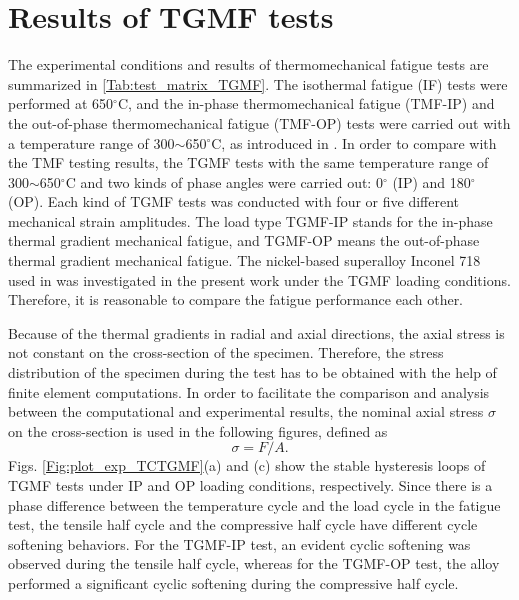\documentclass[preprint,5p,twocolumn,10pt,sort&compress]{elsarticle}
\begin{document}
\section{Results of TGMF tests}

The experimental conditions and results of thermomechanical fatigue tests are summarized in \autoref{Tab:test_matrix_TGMF}. The isothermal fatigue (IF) tests were performed at 650$^\circ$C, and the in-phase thermomechanical fatigue (TMF-IP) and the out-of-phase thermomechanical fatigue (TMF-OP) tests were carried out with a temperature range of 300$\sim$650$^\circ$C, as introduced in \cite{SUN2019228, SUN201989}. In order to compare with the TMF testing results, the TGMF tests with the same temperature range of 300$\sim$650$^\circ$C and two kinds of phase angles were carried out: 0$^\circ$ (IP) and 180$^\circ$ (OP). Each kind of TGMF tests was conducted with four or five different mechanical strain amplitudes. The load type TGMF-IP stands for the in-phase thermal gradient mechanical fatigue, and TGMF-OP means the out-of-phase thermal gradient mechanical fatigue. The nickel-based superalloy Inconel 718 used in \cite{SUN2019228, SUN201989} was investigated in the present work under the TGMF loading conditions. Therefore, it is reasonable to compare the fatigue performance each other.

Because of the thermal gradients in radial and axial directions, the axial stress is not constant on the cross-section of the specimen.
Therefore, the stress distribution of the specimen during the test has to be obtained with the help of finite element computations.
In order to facilitate the comparison and analysis between the computational and experimental results, the nominal axial stress $\sigma$ on the cross-section is used in the following figures, defined as
\begin{equation}
\sigma = F/A.
\end{equation}
Figs. \ref{Fig:plot_exp_TCTGMF}(a) and (c) show the stable hysteresis loops of TGMF tests under IP and OP loading conditions, respectively.
Since there is a phase difference between the temperature cycle and the load cycle in the fatigue test, the tensile half cycle and the compressive half cycle have different cycle softening behaviors.
For the TGMF-IP test, an evident cyclic softening was observed during the tensile half cycle, whereas for the TGMF-OP test, the alloy performed a significant cyclic softening during the compressive half cycle.
\end{document}
